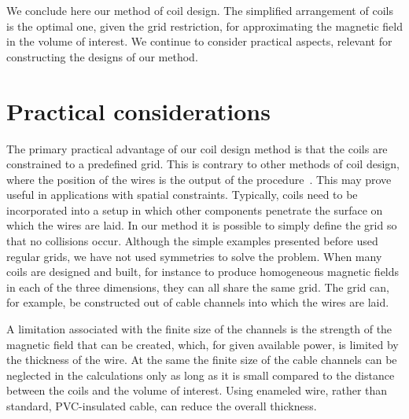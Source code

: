 We conclude here our method of coil design. The simplified arrangement of coils is the optimal one, given the grid restriction, for approximating the magnetic field in the volume of interest. We continue to consider practical aspects, relevant for constructing the designs of our method.



\section{Practical considerations}
The primary practical advantage of our coil design method is that the coils are constrained to a predefined grid. This is contrary to other methods of coil design, where the position of the wires is the output of the procedure~\cite{Turner1993, Beidler1990}. This may prove useful in applications with spatial constraints. Typically, coils need to be incorporated into a setup in which other components penetrate the surface on which the wires are laid. In our method it is possible to simply define the grid so that no collisions occur. Although the simple examples presented before used regular grids, we have not used symmetries to solve the problem. When many coils are designed and built, for instance to produce homogeneous magnetic fields in each of the three dimensions, they can all share the same grid. The grid can, for example, be constructed out of cable channels into which the wires are laid.

A limitation associated with the finite size of the channels is the strength of the magnetic field that can be created, which, for given available power, is limited by the thickness of the wire. At the same the finite size of the cable channels can be neglected in the calculations only as long as it is small compared to the distance between the coils and the volume of interest. Using enameled wire, rather than standard, PVC-insulated cable, can reduce the overall thickness.




